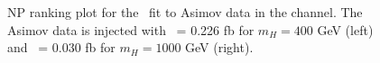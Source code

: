 \begin{figure}[!ht]
\begin{center}
\caption{NP ranking plot for the \xsggF\ fit to Asimov data in the \llll channel.
The Asimov data is injected with \xsggF\ = 0.226 fb for $m_H = 400$ GeV (left) and \xsggF\ = 0.030 fb for $m_H = 1000$ GeV (right).
}
\label{fig:rank_cb_NWA_ggF}
\end{center}
\end{figure}

